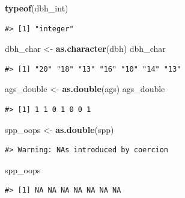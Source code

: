 \documentclass[
  11pt,
]{krantz}
\newenvironment{Shaded}{\begin{snugshade}}{\end{snugshade}}
\newcommand{\KeywordTok}[1]{\textcolor[rgb]{0.13,0.29,0.53}{\textbf{#1}}}
\newcommand{\NormalTok}[1]{#1}
\newcommand{\StringTok}[1]{\textcolor[rgb]{0.31,0.60,0.02}{#1}}
\theoremstyle{definition}
\theoremstyle{definition}
\theoremstyle{definition}
\theoremstyle{definition}
\theoremstyle{remark}
\begin{document}
\begin{Shaded}
\begin{Highlighting}[]
\KeywordTok{typeof}\NormalTok{(dbh\_int)}
\end{Highlighting}
\end{Shaded}

\begin{verbatim}
#> [1] "integer"
\end{verbatim}

\begin{Shaded}
\begin{Highlighting}[]
\NormalTok{dbh\_char \textless{}{-}}\StringTok{ }\KeywordTok{as.character}\NormalTok{(dbh)}
\NormalTok{dbh\_char}
\end{Highlighting}
\end{Shaded}

\begin{verbatim}
#> [1] "20" "18" "13" "16" "10" "14" "13"
\end{verbatim}

\begin{Shaded}
\begin{Highlighting}[]
\NormalTok{ags\_double \textless{}{-}}\StringTok{ }\KeywordTok{as.double}\NormalTok{(ags)}
\NormalTok{ags\_double}
\end{Highlighting}
\end{Shaded}

\begin{verbatim}
#> [1] 1 1 0 1 0 0 1
\end{verbatim}

\begin{Shaded}
\begin{Highlighting}[]
\NormalTok{spp\_oops \textless{}{-}}\StringTok{ }\KeywordTok{as.double}\NormalTok{(spp)}
\end{Highlighting}
\end{Shaded}

\begin{verbatim}
#> Warning: NAs introduced by coercion
\end{verbatim}

\begin{Shaded}
\begin{Highlighting}[]
\NormalTok{spp\_oops}
\end{Highlighting}
\end{Shaded}

\begin{verbatim}
#> [1] NA NA NA NA NA NA NA
\end{verbatim}
\end{document}
